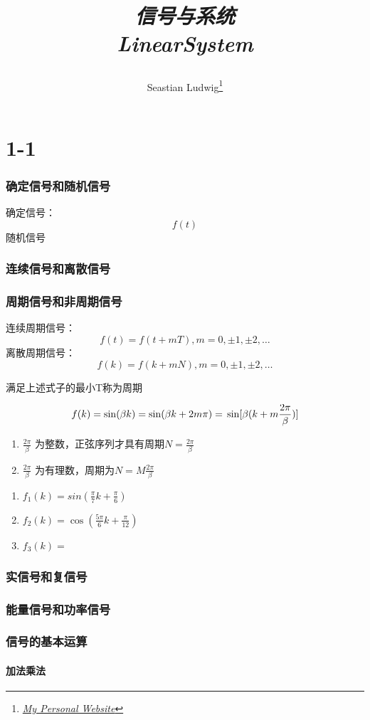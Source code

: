 \documentclass[10pt]{ctexart}
\title{\begin{center}{\Huge \textit{信号与系统}}\\{{\itshape LinearSystem}}\end{center}}
\author{Seastian Ludwig\footnote{\href{https://geodesick.com/}{\textit{My Personal Website}}}}
\affiliation{
   University of Northeast Electronic Power University\\
Electronic Engineer school\\
}
\begin{document}
\maketitle
\flushbottom
\newpage
\pagestyle{fancynotes}

\part{1-1}
\section{确定信号和随机信号}
\begin{definition}

   确定信号：$$	f(t)$$ 
   随机信号
\end{definition}
\section{连续信号和离散信号}
\section{周期信号和非周期信号}
\begin{definition}
   连续周期信号：
   $$	f(t)=f(t+mT),m=0,\pm 1,\pm 2,\dots$$ 
   离散周期信号：
   $$	f(k)=f(k+mN),m=0,\pm 1,\pm 2,\dots$$ 
\end{definition}
\begin{margintable}
   满足上述式子的最小T称为周期

   $$	f(k)=\sin(\beta k)=\sin(\beta k+2m\pi)=\\ \sin[\beta (k+m\frac{2\pi}{\beta})]$$ 
\end{margintable}
\begin{lemma}
   \begin{enumerate}
      \item $ \frac{2\pi}{\beta} $ 为整数，正弦序列才具有周期$ N=\frac{2\pi}{\beta} $ 
      \item  $ \frac{2\pi}{\beta} $ 为有理数，周期为$ N=M\frac{2\pi}{\beta} $ 
   \end{enumerate}
\end{lemma}
\begin{example}
   \begin{enumerate}
      \item $ f_{1}(k)=sin(\frac{\pi}{7}k+\frac{\pi}{6})  $ 
      \item $ f_{2}(k)  =\cos(\frac{5\pi}{6}k+\frac{\pi}{12})$ 
      \item $ f_{3} (k)= $ 
   \end{enumerate}
\end{example}
\section{实信号和复信号}
\section{能量信号和功率信号}
\section{信号的基本运算}
\subsection{加法乘法}
\end{document}
